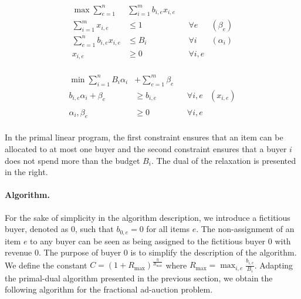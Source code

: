 \begin{minipage}[t]{0.45\textwidth}
\begin{align*}
\max  \sum_{e=1}^{n} & \sum_{i=1}^{m} b_{i,e} x_{i,e} & \\
\sum_{i=1}^{m} x_{i,e}  &\leq 1 & &  \forall e & (\beta_e) \\
\sum_{e=1}^{n} b_{i,e} x_{i,e} &\leq  B_{i} & & \forall i & (\alpha_i) \\
x_{i,e} &\geq 0 & & \forall i, e\\
\end{align*}
\end{minipage}
\quad
\begin{minipage}[t]{0.5\textwidth}
\begin{align*}
\min \sum_{i=1}^{n} B_{i} \alpha_{i} &+ \sum_{e=1}^{m} \beta_{e} \\ 
b_{i,e} \alpha_{i} + \beta_{e} &\geq b_{i,e}  & &  \forall i, e & (x_{i,e})\\  \\
\alpha_{i}, \beta_{e} &\geq 0 & & \forall i,e \\
\end{align*}
\end{minipage}
%
In the primal linear program, the first constraint ensures that an item can be allocated to at most one buyer and 
the second constraint ensures that a buyer $i$ does not spend more than the budget $B_{i}$.
The dual of the relaxation is presented in the right.  

\paragraph{Algorithm.} 

For the sake of simplicity in the algorithm description, we introduce a fictitious buyer, denoted as $0$, such that  
$b_{0, e} = 0$ for all items $e$. The non-assignment of an item $e$ to any buyer can be seen as being assigned 
to the fictitious buyer $0$ with revenue 0.
The purpose of buyer $0$   is to simplify the description of the algorithm.
 We define the constant $C = (1 + R_{\max})^{\frac{\eta}{R_{\max}}}$ where 
$R_{\max} = \max_{i,e} \frac{b_{i,e}}{B_{i}}$. Adapting the primal-dual algorithm presented in the previous section, we obtain the following algorithm for the fractional ad-auction problem.

